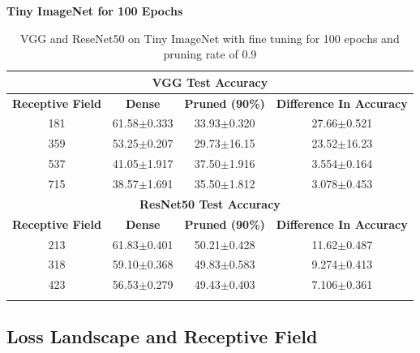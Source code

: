 \textbf{ Tiny ImageNet for 100 Epochs}
\begin{table}[H]
  \centering
\begin{tabular}{@{}cccc@{}}
\toprule
\multicolumn{4}{c}{\textbf{VGG  Test Accuracy}}                                                                    \\ \midrule
\textbf{Receptive Field} & \textbf{Dense}  & \textbf{Pruned (90\%)} & \multicolumn{1}{l}{\textbf{Difference In Accuracy}} \\ \midrule
181                      & 61.58$\pm$0.333 & 33.93$\pm$0.320 & 27.66$\pm$0.521                                     \\
359                      & 53.25$\pm$0.207 & 29.73$\pm$16.15 & 23.52$\pm$16.23                                     \\
537                      & 41.05$\pm$1.917 & 37.50$\pm$1.916 & 3.554$\pm$0.164                                     \\
715                      & 38.57$\pm$1.691 & 35.50$\pm$1.812 & 3.078$\pm$0.453                                     \\ \midrule
\multicolumn{4}{c}{\textbf{ResNet50 Test Accuracy}}                                                                \\ \midrule
\textbf{Receptive Field} & \textbf{Dense}  & \textbf{Pruned (90\%)} & \textbf{Difference In Accuracy}                     \\
\midrule
213                      & 61.83$\pm$0.401 & 50.21$\pm$0.428 & 11.62$\pm$0.487                                     \\
318                      & 59.10$\pm$0.368 & 49.83$\pm$0.583 & 9.274$\pm$0.413                                     \\
423                      & 56.53$\pm$0.279 & 49.43$\pm$0.403 & 7.106$\pm$0.361                                     \\
\bottomrule \\
\end{tabular}
\caption{VGG and ReseNet50 on Tiny ImageNet with fine tuning for 100 epochs and pruning rate of 0.9}
\label{tab:tiny imagenet fine tuning pruning rate 09}
\end{table}




\subsection{Loss Landscape and Receptive Field}

